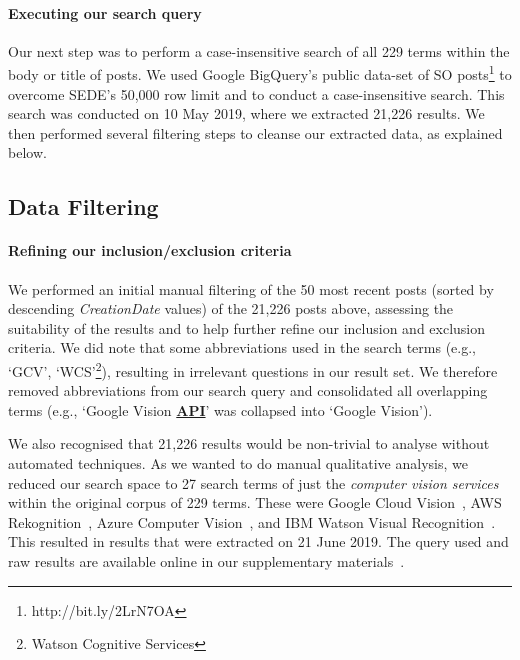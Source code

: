 \paragraph{Executing our search query}

Our next step was to perform a case-insensitive search of all 229 terms within the body or title of posts. We used Google BigQuery's public data-set of SO posts\footnote{http://bit.ly/2LrN7OA} to overcome SEDE's 50,000 row limit and to conduct a case-insensitive search. This search was conducted on 10 May 2019, where we extracted 21,226 results. We then performed several filtering steps to cleanse our extracted data, as explained below.

\subsection{Data Filtering}
\label{icse2020:ssec:method:filtering}


\paragraph{Refining our inclusion/exclusion criteria}
\label{icse2020:ssec:method:filtering:refining}

We performed an initial manual filtering of the 50 most recent posts (sorted by descending \textit{CreationDate} values) of the 21,226 posts above, assessing the suitability of the results and to help further refine our inclusion and exclusion criteria. We did note that some abbreviations used in the search terms (e.g., `GCV', `WCS'\footnote{Watson Cognitive Services}), resulting in irrelevant questions in our result set. We therefore removed abbreviations from our search query and consolidated all overlapping terms (e.g., `Google Vision \underline{\textbf{API}}' was collapsed into `Google Vision').

We also recognised that 21,226 results would be non-trivial to analyse without automated techniques. As we wanted to do manual qualitative analysis, we reduced our search space to 27 search terms of just the \textit{computer vision services} within the original corpus of 229 terms. These were Google Cloud Vision~, AWS Rekognition~, Azure Computer Vision~, and IBM Watson Visual Recognition~. This resulted in \NumPostsFromSO{} results that were extracted on 21 June 2019. The query used and raw results are available online in our supplementary materials~.

